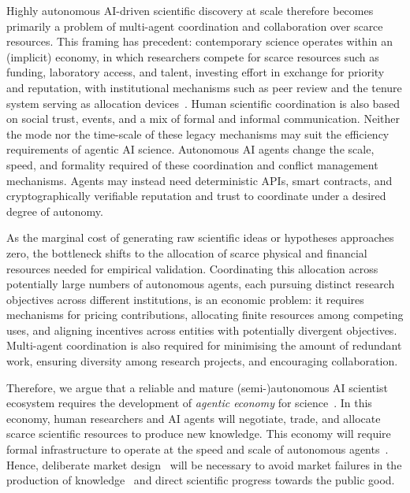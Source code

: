 \documentclass[11pt, a4paper, twocolumn, goog]{google}
\begin{document}
Highly autonomous AI-driven scientific discovery at scale therefore becomes primarily a problem of multi-agent coordination and collaboration over scarce resources. This framing has precedent: contemporary science operates within an (implicit) economy, in which researchers compete for scarce resources such as funding, laboratory access, and talent, investing effort in exchange for priority and reputation, with institutional mechanisms such as peer review and the tenure system serving as allocation devices~\citep{partha1994toward, stephan2015economics}. Human scientific coordination is also based on social trust, events, and a mix of formal and informal communication. Neither the mode nor the time-scale of these legacy mechanisms may suit the efficiency requirements of agentic AI science. Autonomous AI agents change the scale, speed, and formality required of these coordination and conflict management mechanisms. Agents may instead need deterministic APIs, smart contracts, and cryptographically verifiable reputation and trust to coordinate under a desired degree of autonomy.

As the marginal cost of generating raw scientific ideas or hypotheses approaches zero, the bottleneck shifts to the allocation of scarce physical and financial resources needed for empirical validation. Coordinating this allocation across potentially large numbers of autonomous agents, each pursuing distinct research objectives across different institutions, is an economic problem: it requires mechanisms for pricing contributions, allocating finite resources among competing uses, and aligning incentives across entities with potentially divergent objectives. Multi-agent coordination is also required for minimising the amount of redundant work, ensuring diversity among research projects, and encouraging collaboration.

Therefore, we argue that a reliable and mature (semi-)autonomous AI scientist ecosystem requires the development of \emph{agentic economy} for science~\citep{tomasev2025virtualagenteconomies}. In this economy, human researchers and AI agents will negotiate, trade, and allocate scarce scientific resources to produce new knowledge. This economy will require formal infrastructure to operate at the speed and scale of autonomous agents~\citep{jiang2025scpacceleratingdiscoveryglobal}. Hence, deliberate market design~\citep{roth2002economist} will be necessary to avoid market failures in the production of knowledge~\citep{nelson1959simple, arrow1962economic} and direct scientific progress towards the public good.
\end{document}
